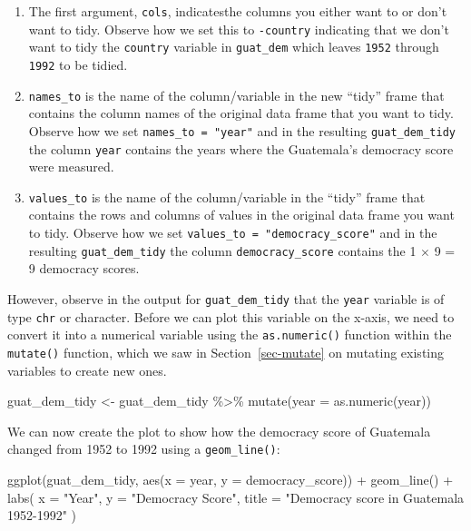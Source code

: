 \documentclass[
  letterpaper,
  DIV=11,
  numbers=noendperiod]{scrreprt}
\newenvironment{Shaded}{\begin{snugshade}}{\end{snugshade}}
\newcommand{\AttributeTok}[1]{\textcolor[rgb]{0.40,0.45,0.13}{#1}}
\newcommand{\FunctionTok}[1]{\textcolor[rgb]{0.28,0.35,0.67}{#1}}
\newcommand{\NormalTok}[1]{\textcolor[rgb]{0.00,0.23,0.31}{#1}}
\newcommand{\OtherTok}[1]{\textcolor[rgb]{0.00,0.23,0.31}{#1}}
\newcommand{\SpecialCharTok}[1]{\textcolor[rgb]{0.37,0.37,0.37}{#1}}
\newcommand{\StringTok}[1]{\textcolor[rgb]{0.13,0.47,0.30}{#1}}
\theoremstyle{definition}
\theoremstyle{remark}
\begin{document}
\begin{enumerate}
\def\labelenumi{\arabic{enumi}.}
\item
  The first argument, \texttt{cols}, indicatesthe columns you either
  want to or don't want to tidy. Observe how we set this to
  \texttt{-country} indicating that we don't want to tidy the
  \texttt{country} variable in \texttt{guat\_dem} which leaves
  \texttt{1952} through \texttt{1992} to be tidied.
\item
  \texttt{names\_to} is the name of the column/variable in the new
  ``tidy'' frame that contains the column names of the original data
  frame that you want to tidy. Observe how we set
  \texttt{names\_to\ =\ "year"} and in the resulting
  \texttt{guat\_dem\_tidy} the column \texttt{year} contains the years
  where the Guatemala's democracy score were measured.
\item
  \texttt{values\_to} is the name of the column/variable in the ``tidy''
  frame that contains the rows and columns of values in the original
  data frame you want to tidy. Observe how we set
  \texttt{values\_to\ =\ "democracy\_score"} and in the resulting
  \texttt{guat\_dem\_tidy} the column \texttt{democracy\_score} contains
  the 1 \(\times\) 9 = 9 democracy scores.
\end{enumerate}

However, observe in the output for \texttt{guat\_dem\_tidy} that the
\texttt{year} variable is of type \texttt{chr} or character. Before we
can plot this variable on the x-axis, we need to convert it into a
numerical variable using the \texttt{as.numeric()} function within the
\texttt{mutate()} function, which we saw in Section~\ref{sec-mutate} on
mutating existing variables to create new ones.

\begin{Shaded}
\begin{Highlighting}[]
\NormalTok{guat\_dem\_tidy }\OtherTok{\textless{}{-}}\NormalTok{ guat\_dem\_tidy }\SpecialCharTok{\%\textgreater{}\%} 
  \FunctionTok{mutate}\NormalTok{(}\AttributeTok{year =} \FunctionTok{as.numeric}\NormalTok{(year))}
\end{Highlighting}
\end{Shaded}

We can now create the plot to show how the democracy score of Guatemala
changed from 1952 to 1992 using a \texttt{geom\_line()}:

\begin{Shaded}
\begin{Highlighting}[]
\FunctionTok{ggplot}\NormalTok{(guat\_dem\_tidy, }\FunctionTok{aes}\NormalTok{(}\AttributeTok{x =}\NormalTok{ year, }\AttributeTok{y =}\NormalTok{ democracy\_score)) }\SpecialCharTok{+}
  \FunctionTok{geom\_line}\NormalTok{() }\SpecialCharTok{+}
  \FunctionTok{labs}\NormalTok{(}
    \AttributeTok{x =} \StringTok{"Year"}\NormalTok{, }
    \AttributeTok{y =} \StringTok{"Democracy Score"}\NormalTok{,}
    \AttributeTok{title =} \StringTok{"Democracy score in Guatemala 1952{-}1992"}
\NormalTok{  )}
\end{Highlighting}
\end{Shaded}
\end{document}
